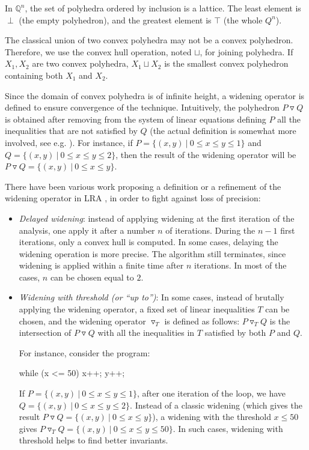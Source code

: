 \documentclass[a4paper,english,titlepage,11pt]{report}
\def\Q{\mathbb{Q}}
\newcommand{\widening}{\mathop{\triangledown}}
\begin{document}
In $\Q^n$, the set of polyhedra ordered by inclusion is a lattice. The least element is $\perp$
(the empty polyhedron), and the greatest element is $\top$ (the whole $Q^n$).

The classical union of two convex polyhedra may not be a convex polyhedron.
Therefore, we use the convex hull operation, noted $\sqcup$, for joining
polyhedra. 
If $X_1, X_2$ are two convex polyhedra, $X_1 \sqcup X_2$ is the
smallest convex polyhedron containing both $X_1$ and $X_2$.

Since the domain of convex polyhedra is of infinite height, a widening operator
is defined to ensure convergence of the technique. 
Intuitively, the polyhedron $P \widening Q$ is obtained after 
removing from the system of linear equations defining $P$ all the inequalities
that are not satisfied by $Q$ (the actual definition is somewhat more involved,
see e.g. \cite{BagnaraHRZ05SCP}).
For instance, if $P = \{(x,y)\ |\ 0 \leq x \leq y \leq 1 \}$ and $Q = 
\{(x,y)\ |\ 0 \leq x \leq y \leq 2 \}$, then the result of the widening operator
will be $P \widening Q = \{(x,y)\ |\ 0 \leq x \leq y \}$.

There have been various
work proposing a definition or a refinement of the widening operator in LRA
\cite{CH78,Hal79,HPR97,BlanchetCousotEtAl_PLDI03}, in order to fight
against loss of precision:
\begin{itemize}
\item \emph{Delayed widening}: instead of applying widening at the first
iteration of the analysis, one apply it after a number $n$ of iterations. During
the $n-1$ first iterations, only a convex hull is computed. In some cases,
delaying the widening operation is more precise. The algorithm still terminates,
since widening is applied within a finite time after $n$ iterations. In most of
the cases, $n$ can be chosen equal to $2$.
\item \emph{Widening with threshold (or ``up to'')}: In some cases, instead of
brutally applying the widening operator, a fixed set of linear inequalities $T$
can be chosen, and the widening operator $\widening_T$ is defined as follows:
$P \widening_T Q$ is the intersection of $P \widening Q$ with all the inequalities in
$T$ satisfied by both $P$ and $Q$.

For instance, consider the program:
\begin{C}
while (x <= 50) {
	x++;
	y++;
}
\end{C}
If $P = \{(x,y)\ |\ 0 \leq x \leq y \leq 1 \}$, after one iteration of the loop,
we have 
\\$Q = \{(x,y)\ |\ 0 \leq x \leq y \leq 2 \}$. Instead of a classic
widening (which gives the result $P \widening Q = \{(x,y)\ |\ 0 \leq x \leq y \}$),
a widening with the threshold $x \leq 50$ gives 
$P \widening_T Q = \{(x,y)\ |\ 0 \leq x \leq y \leq 50\}$. In such cases, widening
with threshold helps to find better invariants.
\end{itemize}
\end{document}
